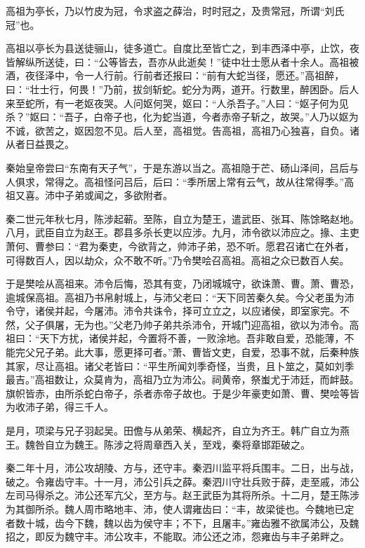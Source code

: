 \documentclass[]{article}
\begin{document}
高祖为亭长，乃以竹皮为冠，令求盗之薛治，时时冠之，及贵常冠，所谓``刘氏冠''也。

高祖以亭长为县送徒骊山，徒多道亡。自度比至皆亡之，到丰西泽中亭，止饮，夜皆解纵所送徒，曰：``公等皆去，吾亦从此逝矣！''徒中壮士愿从者十余人。高祖被酒，夜径泽中，令一人行前。行前者还报曰：``前有大蛇当径，愿还。''高祖醉，曰：``壮士行，何畏！''乃前，拔剑斩蛇。蛇分为两，道开。行数里，醉困卧。后人来至蛇所，有一老妪夜哭。人问妪何哭，妪曰：``人杀吾子。''人曰：``妪子何为见杀？''妪曰：``吾子，白帝子也，化为蛇当道，今者赤帝子斩之，故哭。''人乃以妪为不诚，欲苦之，妪因忽不见。后人至，高祖觉。告高祖，高祖乃心独喜，自负。诸从者日益畏之。

秦始皇帝尝曰``东南有天子气''，于是东游以当之。高祖隐于芒、砀山泽间，吕后与人俱求，常得之。高祖怪问吕后，后曰：``季所居上常有云气，故从往常得季。''高祖又喜。沛中子弟或闻之，多欲附者。

秦二世元年秋七月，陈涉起蕲。至陈，自立为楚王，遣武臣、张耳、陈馀略赵地。八月，武臣自立为赵王。郡县多杀长吏以应涉。九月，沛令欲以沛应之。掾、主吏萧何、曹参曰：``君为秦吏，今欲背之，帅沛子弟，恐不听。愿君召诸亡在外者，可得数百人，因以劫众，众不敢不听。''乃令樊哙召高祖。高祖之众已数百人矣。

于是樊哙从高祖来。沛令后悔，恐其有变，乃闭城城守，欲诛萧、曹。萧、曹恐，逾城保高祖。高祖乃书帛射城上，与沛父老曰：``天下同苦秦久矣。今父老虽为沛令守，诸侯并起，今屠沛。沛令共诛令，择可立立之，以应诸侯，即室家完。不然，父子俱屠，无为也。''父老乃帅子弟共杀沛令，开城门迎高祖，欲以为沛令。高祖曰：``天下方扰，诸侯并起，今置将不善，一败涂地。吾非敢自爱，恐能薄，不能完父兄子弟。此大事，愿更择可者。''萧、曹皆文吏，自爱，恐事不就，后秦种族其家，尽让高祖。诸父老皆曰：``平生所闻刘季奇怪，当贵，且卜筮之，莫如刘季最吉。''高祖数让，众莫肯为，高祖乃立为沛公。祠黄帝，祭蚩尤于沛廷，而衅鼓。旗帜皆赤，由所杀蛇白帝子，杀者赤帝子故也。于是少年豪吏如萧、曹、樊哙等皆为收沛子弟，得三千人。

是月，项梁与兄子羽起吴。田儋与从弟荣、横起齐，自立为齐王。韩广自立为燕王。魏咎自立为魏王。陈涉之将周章西入关，至戏，秦将章邯距破之。

秦二年十月，沛公攻胡陵、方与，还守丰。秦泗川监平将兵围丰。二日，出与战，破之。令雍齿守丰。十一月，沛公引兵之薛。秦泗川守壮兵败于薛，走至戚，沛公左司马得杀之。沛公还军亢父，至方与。赵王武臣为其将所杀。十二月，楚王陈涉为其御所杀。魏人周市略地丰、沛，使人谓雍齿曰：``丰，故梁徙也。今魏地已定者数十城，齿今下魏，魏以齿为侯守丰；不下，且屠丰。''雍齿雅不欲属沛公，及魏招之，即反为魏守丰。沛公攻丰，不能取。沛公还之沛，怨雍齿与丰子弟畔之。
\end{document}
